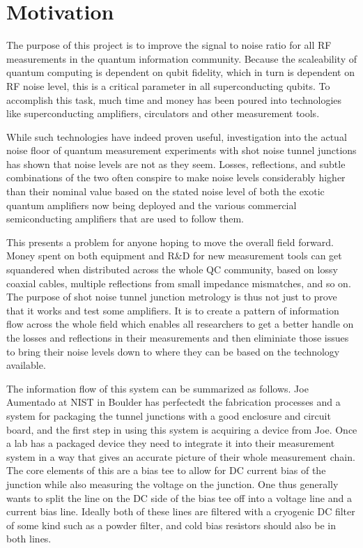 \documentclass[11pt]{article}
\begin{document}
\section{
Motivation}



    The purpose of this project is to improve the signal to noise ratio for all RF measurements in the quantum information community.  Because the scaleability of quantum computing is dependent on qubit fidelity, which in turn is dependent on RF noise level, this is a critical parameter in all superconducting qubits.  To accomplish this task, much time and money has been poured into technologies like superconducting amplifiers, circulators and other measurement tools. 
 



     While such technologies have indeed proven useful, investigation into the actual noise floor of quantum measurement experiments with shot noise tunnel junctions has shown that noise levels are not as they seem.  Losses, reflections, and subtle combinations of the two often conspire to make noise levels considerably higher than their nominal value based on the stated noise level of both the exotic quantum amplifiers now being deployed and the various commercial semiconducting amplifiers that are used to follow them. 




    This presents a problem for anyone hoping to move the overall field forward.  Money spent on both equipment and R&D for new measurement tools can get squandered when distributed across the whole QC community, based on lossy coaxial cables, multiple reflections from small impedance mismatches, and so on.  The purpose of shot noise tunnel junction metrology is thus not just to prove that it works and test some amplifiers.  It is to create a pattern of information flow across the whole field which enables all researchers to get a better handle on the losses and reflections in their measurements and then eliminiate those issues to bring their noise levels down to where they can be based on the technology available.  



The information flow of this system can be summarized as follows.  Joe Aumentado at NIST in Boulder has perfectedt the fabrication processes and a system for packaging the tunnel junctions with a good enclosure and circuit board, and the first step in using this system is acquiring a device from Joe.  Once a lab has a packaged device they need to integrate it into their measurement system in a way that gives an accurate picture of their whole measurement chain.  The core elements of this are a bias tee to allow for DC current bias of the junction while also measuring the voltage on the junction.  One thus generally wants to split the line on the DC side of the bias tee off into a voltage line and a current bias line.  Ideally both of these lines are filtered with a cryogenic DC filter of some kind such as a powder filter, and cold bias resistors should also be in both lines.
\end{document}
